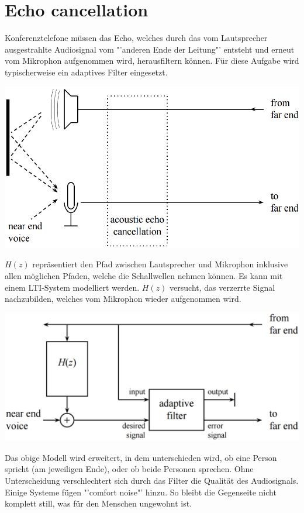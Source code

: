 \section{Echo cancellation}
Konferenztelefone müssen das Echo, welches durch das vom Lautsprecher ausgestrahlte Audiosignal 
vom "'anderen Ende der Leitung"' entsteht und erneut vom Mikrophon aufgenommen wird, herausfiltern 
können. Für diese Aufgabe wird typischerweise ein adaptives Filter eingesetzt. 
\begin{center}
	\includegraphics[width=.5\textwidth]{../fig/echo_cancellation}
\end{center}
$H(z)$ repräsentiert den Pfad zwischen Lautsprecher und Mikrophon inklusive allen möglichen Pfaden, 
welche die Schallwellen nehmen können. Es kann mit einem LTI-System modelliert werden. $H(z)$ 
versucht, das verzerrte Signal nachzubilden, welches vom Mikrophon wieder aufgenommen wird. 
\begin{center}
	\includegraphics[width=.5\textwidth]{../fig/echo_cancellation_modell}
\end{center}
Das obige Modell wird erweitert, in dem unterschieden wird, ob eine Person spricht (am jeweiligen Ende), 
oder ob beide Personen sprechen. Ohne Unterscheidung verschlechtert sich durch das Filter die Qualität
des Audiosignals. Einige Systeme fügen "'comfort noise"' hinzu. So bleibt die Gegenseite nicht komplett
still, was für den Menschen ungewohnt ist. 